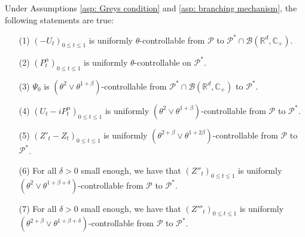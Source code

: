 \documentclass[EJP]{ejpecp} %
\begin{document}
\begin{lemma}
  \label{lem: upper bound for usgx}
  Under Assumptions \ref{asp: Greys condition} and \ref{asp: branching mechanism}, the following statements are true:
  \begin{itemize}
  \item[(1)]
    $(-U_t)_{0\leq t\leq 1}$ is uniformly $\theta$-controllable from $\mathcal P$ to $\mathcal P^*\cap \mathcal B(\mathbb R^d, \mathbb C_+)$.
  \item[(2)]
    $(P^\alpha_t)_{0\leq t\leq 1}$ is uniformly $\theta$-controllable on $\mathcal P^*$.
  \item[(3)]
    $\Psi_0$ is $(\theta^2\vee \theta^{1+\beta})$-controllable from $\mathcal P^* \cap \mathcal B(\mathbb R^d, \mathbb C_+)$ to $\mathcal P^*$.
  \item[(4)]
    $(U_t- iP_t^{\alpha})_{0\leq t\leq 1}$ is uniformly $(\theta^2\vee \theta^{1+\beta})$-controllable from $\mathcal P$ to $\mathcal P^*$.
  \item[(5)]
    $(Z'_t-Z_t)_{0\leq t\leq 1}$ is uniformly $(\theta^{2+\beta}\vee \theta^{1+2\beta})$-controllable from $\mathcal P$ to $\mathcal P^*$.
  \item[(6)]
    For all $\delta > 0$ small enough, we have that $(Z''_t)_{0\leq t\leq 1}$ is uniformly $(\theta^2\vee \theta^{1+\beta+\delta})$-controllable from $\mathcal P$ to $\mathcal P^*$.
  \item[(7)]
    For all $\delta > 0$ small enough, we have that $(Z'''_t)_{0\leq t\leq 1}$ is uniformly $(\theta^{2+\beta}\vee \theta^{1+\beta+\delta})$-controllable from $\mathcal P$ to $\mathcal P^*$.
\end{itemize}
\end{lemma}
\end{document}

